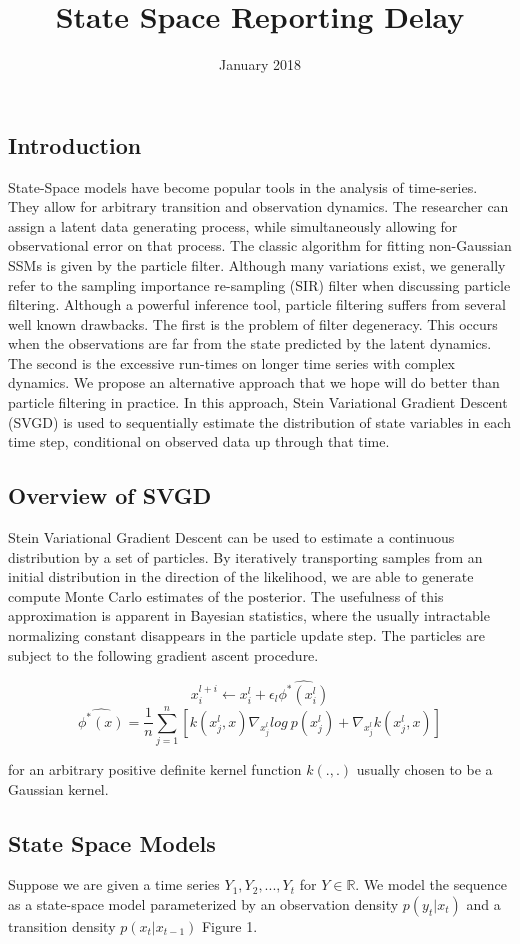 \documentclass{article}
\title{State Space Reporting Delay}
\date{January 2018}
\begin{document}
\subsection*{Introduction}

State-Space models have become popular tools in the analysis of time-series. They allow for arbitrary transition and observation dynamics. The researcher can assign a latent data generating process, while simultaneously allowing for observational error on that process. The classic algorithm for fitting non-Gaussian SSMs is given by the particle filter. Although many variations exist, we generally refer to the sampling importance re-sampling (SIR) filter when discussing particle filtering. Although a powerful inference tool, particle filtering suffers from several well known drawbacks. The first is the problem of filter degeneracy. This occurs when the observations are far from the state predicted by the latent dynamics. The second is the excessive run-times on longer time series with complex dynamics. 
We propose an alternative approach that we hope will do better than particle filtering in practice.  In this approach, Stein Variational Gradient Descent (SVGD) is used to sequentially estimate the distribution of state variables in each time step, conditional on observed data up through that time.  

\subsection*{Overview of SVGD}
Stein Variational Gradient Descent can be used to estimate a continuous distribution by a set of particles. By iteratively transporting samples from an initial distribution in the direction of the likelihood, we are able to generate compute Monte Carlo estimates of the posterior. The usefulness of this approximation is apparent in Bayesian statistics, where the usually intractable normalizing constant disappears in the particle update step. The particles are subject to the following gradient ascent procedure. 

$$x_i^{l+i} \leftarrow x_i^{l}+\epsilon_l\hat{\phi^*(x_i^l)}   $$
$$\hat{\phi^*(x)} = \frac{1}{n}\sum_{j=1}^n[k(x_j^l,x)\nabla_{x_j^l}log\ p(x_j^l) + \nabla_{x_j^l}k(x_j^l,x)]$$



for an arbitrary positive definite kernel function $k(.,.)$ usually chosen to be a Gaussian kernel.


\subsection*{State Space Models}
Suppose we are given a time series $Y_1,Y_2,...,Y_t$ for $Y \in \mathbb{R}$. We model the sequence as a state-space model parameterized by an observation density $p(y_t | x_t)$ and a transition density $p(x_t | x_{t-1})$ Figure 1.
\end{document}
